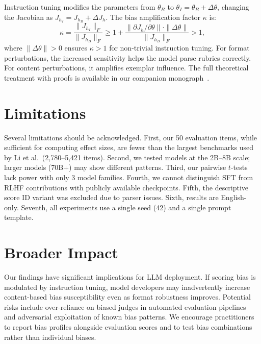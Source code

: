 \documentclass[11pt,twocolumn]{article}
\begin{document}
Instruction tuning modifies the parameters from $\theta_B$ to $\theta_I = \theta_B + \Delta\theta$, changing the Jacobian as $J_{h_I} = J_{h_B} + \Delta J_h$. The bias amplification factor $\kappa$ is:
\begin{equation}
\kappa = \frac{\|J_{h_I}\|_F}{\|J_{h_B}\|_F} \geq 1 + \frac{\|\partial J_h / \partial \theta\| \cdot \|\Delta\theta\|}{\|J_{h_B}\|_F} > 1,
\end{equation}
where $\|\Delta\theta\| > 0$ ensures $\kappa > 1$ for non-trivial instruction tuning. For format perturbations, the increased sensitivity helps the model parse rubrics correctly. For content perturbations, it amplifies exemplar influence. The full theoretical treatment with proofs is available in our companion monograph~\cite{monograph2026}.

\section{Limitations}

Several limitations should be acknowledged. First, our 50 evaluation items, while sufficient for computing effect sizes, are fewer than the largest benchmarks used by Li et al.~(2,780--5,421 items). Second, we tested models at the 2B--8B scale; larger models (70B+) may show different patterns. Third, our pairwise $t$-tests lack power with only 3 model families. Fourth, we cannot distinguish SFT from RLHF contributions with publicly available checkpoints. Fifth, the descriptive score ID variant was excluded due to parser issues. Sixth, results are English-only. Seventh, all experiments use a single seed (42) and a single prompt template.

\section{Broader Impact}

Our findings have significant implications for LLM deployment. If scoring bias is modulated by instruction tuning, model developers may inadvertently increase content-based bias susceptibility even as format robustness improves. Potential risks include over-reliance on biased judges in automated evaluation pipelines~\cite{zheng2023judging,bai2022constitutional} and adversarial exploitation of known bias patterns. We encourage practitioners to report bias profiles alongside evaluation scores and to test bias combinations rather than individual biases.
\end{document}
